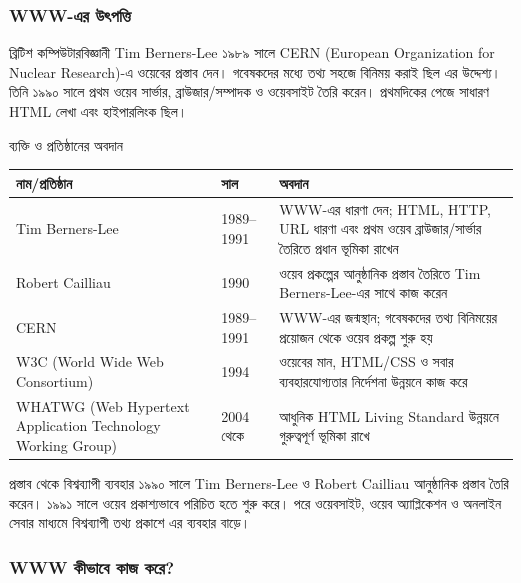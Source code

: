 \subsubsection{WWW-এর উৎপত্তি}

ব্রিটিশ কম্পিউটারবিজ্ঞানী Tim Berners-Lee ১৯৮৯ সালে CERN (European Organization for Nuclear Research)-এ ওয়েবের প্রস্তাব দেন। গবেষকদের মধ্যে তথ্য সহজে বিনিময় করাই ছিল এর উদ্দেশ্য। তিনি ১৯৯০ সালে প্রথম ওয়েব সার্ভার, ব্রাউজার/সম্পাদক ও ওয়েবসাইট তৈরি করেন। প্রথমদিকের পেজে সাধারণ HTML লেখা এবং হাইপারলিংক ছিল।

\begin{boardbox}{ব্যক্তি ও প্রতিষ্ঠানের অবদান}
\begin{center}
\begin{tabular}{|p{}|p{}|p{}|}
\hline
\textbf{নাম/প্রতিষ্ঠান} & \textbf{সাল} & \textbf{অবদান} \\
\hline
Tim Berners-Lee & 1989--1991 & WWW-এর ধারণা দেন; HTML, HTTP, URL ধারণা এবং প্রথম ওয়েব ব্রাউজার/সার্ভার তৈরিতে প্রধান ভূমিকা রাখেন \\
\hline
Robert Cailliau & 1990 & ওয়েব প্রকল্পের আনুষ্ঠানিক প্রস্তাব তৈরিতে Tim Berners-Lee-এর সাথে কাজ করেন \\
\hline
CERN & 1989--1991 & WWW-এর জন্মস্থান; গবেষকদের তথ্য বিনিময়ের প্রয়োজন থেকে ওয়েব প্রকল্প শুরু হয় \\
\hline
W3C (World Wide Web Consortium) & 1994 & ওয়েবের মান, HTML/CSS ও সবার ব্যবহারযোগ্যতার নির্দেশনা উন্নয়নে কাজ করে \\
\hline
WHATWG (Web Hypertext Application Technology Working Group) & 2004 থেকে & আধুনিক HTML Living Standard উন্নয়নে গুরুত্বপূর্ণ ভূমিকা রাখে \\
\hline
\end{tabular}
\end{center}
\end{boardbox}

\begin{examplebox}{প্রস্তাব থেকে বিশ্বব্যাপী ব্যবহার}
১৯৯০ সালে Tim Berners-Lee ও Robert Cailliau আনুষ্ঠানিক প্রস্তাব তৈরি করেন। ১৯৯১ সালে ওয়েব প্রকাশ্যভাবে পরিচিত হতে শুরু করে। পরে ওয়েবসাইট, ওয়েব অ্যাপ্লিকেশন ও অনলাইন সেবার মাধ্যমে বিশ্বব্যাপী তথ্য প্রকাশে এর ব্যবহার বাড়ে।
\end{examplebox}

\subsubsection{WWW কীভাবে কাজ করে?}

